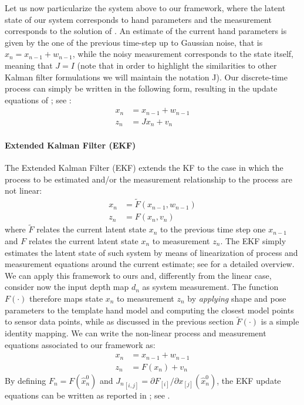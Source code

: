 % 
Let us now particularize the system above to our framework, where the latent state of our system corresponds to hand parameters and the measurement corresponds to the solution of .
% 
An estimate of the current hand parameters is given by the one of the previous time-step up to Gaussian noise, that is $x_n = x_{n-1} + w_{n-1}$, while the noisy measurement corresponds to the state itself, meaning that $J = I$ (note that in order to highlight the similarities to other Kalman filter formulations we will maintain the notation J). Our discrete-time process can simply be written in the following form, resulting in the update equations of ; see \cite{welch1995introduction}:
% 
\begin{align}
x_n &= x_{n - 1} + w_{n - 1} \\
z_n &= J x_n + v_n
\end{align}
% 
% 

%
\paragraph{Extended Kalman Filter (EKF)}
The Extended Kalman Filter (EKF) extends the KF to the case in which the process to be estimated and/or the measurement relationship to the process are not linear:
% 
\begin{align}
x_n &= \tilde{F}(x_{n - 1},  w_{n - 1}) \\
z_n &= F(x_n, v_n)
\end{align}
% 
where $\tilde{F}$ relates the current latent state $ x _n$ to the previous time step one $ x _{n-1}$ and $F$ relates the current latent state $ x _n$ to measurement $ z _n$.
The EKF simply estimates the latent state of such system by means of linearization of process and measurement equations around the current estimate; see \cite{welch1995introduction} for a detailed overview.
We can apply this framework to ours and, differently from the linear case, consider now the input depth map $d_n$ as system measurement. The function $F(\cdot)$ therefore maps state $x_n$ to measurement $z_n$ by \emph{applying} shape and pose parameters to the template hand model and computing the closest model points to sensor data points, while as discussed in the previous section $\tilde{F}(\cdot)$ is a simple identity mapping.
We can write the non-linear process and measurement equations associated to our framework as:
% 
\begin{align}
	x_n &= x_{n - 1} + w_{n - 1} \\
	z_n &= F(x_n) + v_n 
\end{align}
%
By defining $F_n = F(\hat{x}_n^0)$ and ${J_n}_{[i, j]} = \partial F_{[i]} / \partial x_{[j]}(\hat{x}_n^0)$, the EKF update equations can be written as reported in ; see \cite{welch1995introduction}.
%

